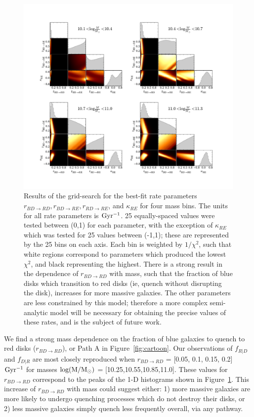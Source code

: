 \documentclass[useAMS,usenatbib]{mn2e}
\begin{document}
\begin{figure}
\centering
\includegraphics[width=\textwidth,trim={0cm 0cm 2cm 1cm},clip]{figures/corner_plot.pdf}
\caption{Results of the grid-search for the best-fit rate parameters $r_{BD \rightarrow RD}, r_{BD \rightarrow RE}, r_{RD \rightarrow RE}$, and $\kappa_{RE}$ for four mass bins. The units for all rate parameters is $\rm Gyr^{-1}$. 25 equally-spaced values were tested between (0,1) for each parameter, with the exception of $\kappa_{RE}$ which was tested for 25 values between (-1,1); these are represented by the 25 bins on each axis. Each bin is weighted by $1/\chi^2$, such that white regions correspond to parameters which produced the lowest $\chi^2$, and black representing the highest. There is a strong result in the dependence of $r_{BD \rightarrow RD}$ with mass, such that the fraction of blue disks which transition to red disks (ie, quench without disrupting the disk), increases for more massive galaxies. The other parameters are less constrained by this model; therefore a more complex semi-analytic model will be necessary for obtaining the precise values of these rates, and is the subject of future work.}
\label{fig:corner}
\end{figure} 

We find a strong mass dependence on the fraction of blue galaxies to quench to red disks ($r_{BD \rightarrow RD}$), or Path A in Figure~\ref{fig:cartoon}. Our observations of $f_{R|D}$ and $f_{D|R}$ are most closely reproduced when $r_{BD \rightarrow RD}$ = [0.05, 0.1, 0.15, 0.2] $\rm Gyr^{-1}$ for masses $\rm log(M/M_{\odot})$ = [10.25,10.55,10.85,11.0]. These values for $r_{BD \rightarrow RD}$ correspond to the peaks of the 1-D histograms shown in Figure~\ref{fig:corner}. This increase of $r_{BD \rightarrow RD}$ with mass could suggest either: 1) more massive galaxies are more likely to undergo quenching processes which do not destroy their disks, or 2) less massive galaxies simply quench less frequently overall, via any pathway. 
\end{document}
